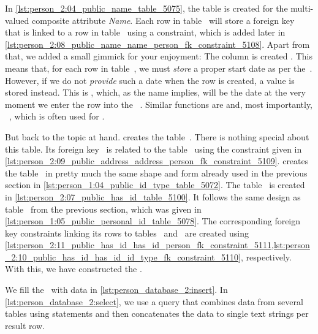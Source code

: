 In \cref{lst:person_2:04_public_name_table_5075}, the table  is created for the multi-valued composite attribute \emph{Name}.
Each row in table~ will store a foreign key~ that is linked to a row in table~ using a  constraint, which is added later in \cref{lst:person_2:08_public_name_name_person_fk_constraint_5108}.
Apart from that, we added a small gimmick for your enjoyment:
The column  is created .
This means that, for each row in table~, we must \emph{store} a proper start date as per the~.
However, if we do not \emph{provide} such a date when the row is created, a  value is stored instead.
This  is , which, as the name implies, will be the date at the very moment we enter the row into the \db~\cite{PGDG:PD:DTFAO}.
Similar functions are  and, most importantly, ~\cite{PGDG:PD:DTFAO}, which is often used for .

But back to the topic at hand.
 creates the table~.
There is nothing special about this table.
Its foreign key~ is related to the table~ using the  constraint given in \cref{lst:person_2:09_public_address_address_person_fk_constraint_5109}.
 creates the table~ in pretty much the same shape and form already used in the previous section in \cref{lst:person_1:04_public_id_type_table_5072}.
The table~ is created in \cref{lst:person_2:07_public_has_id_table_5100}.
It follows the same design as table~ from the previous section, which was given in \cref{lst:person_1:05_public_personal_id_table_5078}.
The corresponding foreign key constraints linking its rows to tables~ and~ are created using \cref{lst:person_2:11_public_has_id_has_id_person_fk_constraint_5111,lst:person_2:10_public_has_id_has_id_id_type_fk_constraint_5110}, respectively.
With this, we have constructed the .

We fill the \db\ with data in \cref{lst:person_database_2:insert}.
In \cref{lst:person_database_2:select}, we use a query that combines data from several tables using  statements and then concatenates the data to single text strings per result row.%
%
\FloatBarrier%
\endhsection%
%
